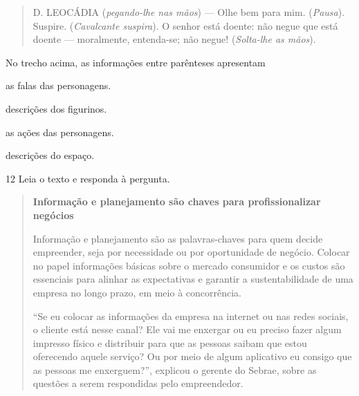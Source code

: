 \begin{quote}
D. LEOCÁDIA (\textit{pegando-lhe nas mãos}) --- Olhe bem para mim. 
(\textit{Pausa}). Suspire. (\textit{Cavalcante suspira}). O senhor está
doente: não negue que está doente --- moralmente, entenda-se; não negue!
(\textit{Solta-lhe as mãos}).
\end{quote}


No trecho acima, as informações entre parênteses apresentam

\begin{escolha}
  \item as falas das personagens.

  \item descrições dos figurinos.

  \item as ações das personagens.

  \item descrições do espaço.
\end{escolha}



\num{12} Leia o texto e responda à pergunta.

\begin{quote}
\textbf{Informação e planejamento são chaves para profissionalizar negócios}

Informação e planejamento são as palavras-chaves para quem decide
empreender, seja por necessidade ou por oportunidade de negócio. Colocar
no papel informações básicas sobre o mercado consumidor e os custos são
essenciais para alinhar as expectativas e garantir a sustentabilidade de
uma empresa no longo prazo, em meio à concorrência.

``Se eu colocar as informações da empresa na internet ou nas redes
sociais, o cliente está nesse canal? Ele vai me enxergar ou eu preciso
fazer algum impresso físico e distribuir para que as pessoas saibam que
estou oferecendo aquele serviço? Ou por meio de algum aplicativo eu
consigo que as pessoas me enxerguem?'', explicou o gerente do Sebrae,
sobre as questões a serem respondidas pelo empreendedor.
\end{quote}


